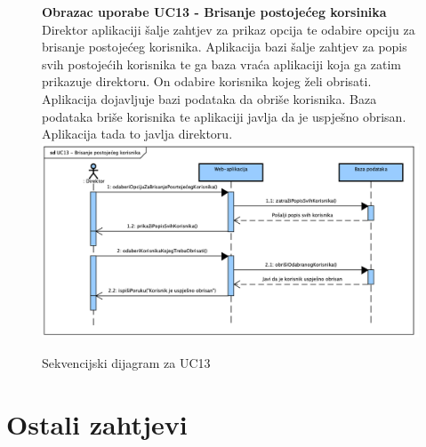 				\begin{figure}[H]
					\textbf{Obrazac uporabe UC13 - Brisanje postojećeg korsinika}
					\newline
					Direktor aplikaciji šalje zahtjev za prikaz opcija te odabire opciju za brisanje postojećeg korisnika. Aplikacija bazi šalje zahtjev za popis svih postojećih korisnika te ga baza vraća aplikaciji koja ga zatim prikazuje direktoru.
					On odabire korisnika kojeg želi obrisati. Aplikacija dojavljuje bazi podataka da obriše korisnika. Baza podataka briše korisnika te aplikaciji javlja da je uspješno obrisan. Aplikacija tada to javlja direktoru.
					\newline
					\includegraphics[width=\textwidth]{slike/Sequence_UC13.png}
					\caption{Sekvencijski dijagram za UC13}
					\label{fig:sequence_UC13}
				\end{figure}

	
		\section{Ostali zahtjevi}
		 
